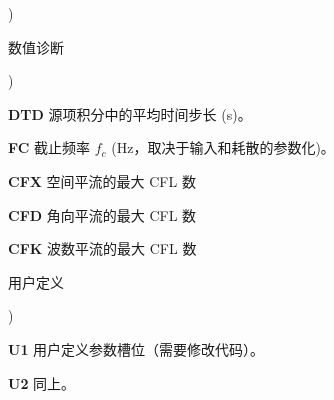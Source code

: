 \begin{list}{)\hfill}
\item{数值诊断}

\begin{list}{)\hfill}
            { \leftmargin 8mm 
             \rightmargin 0mm \itemsep 0mm \parsep 0mm}
\item \textbf{DTD} 源项积分中的平均时间步长 (s)。
\item \textbf{FC} 截止频率 $f_c$ (Hz，取决于输入和耗散的参数化)。
\item \textbf{CFX} 空间平流的最大 CFL 数
\item \textbf{CFD} 角向平流的最大 CFL 数
\item \textbf{CFK} 波数平流的最大 CFL 数
\end{list}

\item{用户定义}

\begin{list}{)\hfill}
            { \leftmargin 8mm 
             \rightmargin 0mm \itemsep 0mm \parsep 0mm}

\item \textbf{U1} 用户定义参数槽位（需要修改代码）。
\item \textbf{U2} 同上。
\end{list}

\end{list}





